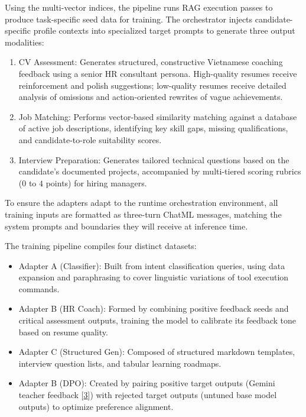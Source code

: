 \documentclass[12pt, a4paper]{report}
\begin{document}
\vspace{0.6cm}
\vspace{0.4cm}

Using the multi-vector indices, the pipeline runs RAG execution passes to produce task-specific seed data for training. The orchestrator injects candidate-specific profile contexts into specialized target prompts to generate three output modalities:
\begin{enumerate}
    \item CV Assessment: Generates structured, constructive Vietnamese coaching feedback using a senior HR consultant persona. High-quality resumes receive reinforcement and polish suggestions; low-quality resumes receive detailed analysis of omissions and action-oriented rewrites of vague achievements.
    \item Job Matching: Performs vector-based similarity matching against a database of active job descriptions, identifying key skill gaps, missing qualifications, and candidate-to-role suitability scores.
    \item Interview Preparation: Generates tailored technical questions based on the candidate's documented projects, accompanied by multi-tiered scoring rubrics ($0$ to $4$ points) for hiring managers.
\end{enumerate}

\vspace{0.6cm}
\vspace{0.4cm}

To ensure the adapters adapt to the runtime orchestration environment, all training inputs are formatted as three-turn ChatML messages, matching the system prompts and boundaries they will receive at inference time.

The training pipeline compiles four distinct datasets:
\begin{itemize}
    \item Adapter A (Classifier): Built from intent classification queries, using data expansion and paraphrasing to cover linguistic variations of tool execution commands.
    \item Adapter B (HR Coach): Formed by combining positive feedback seeds and critical assessment outputs, training the model to calibrate its feedback tone based on resume quality.
    \item Adapter C (Structured Gen): Composed of structured markdown templates, interview question lists, and tabular learning roadmaps.
    \item Adapter B (DPO): Created by pairing positive target outputs (Gemini teacher feedback [\hyperlink{cite3}{3}]) with rejected target outputs (untuned base model outputs) to optimize preference alignment.
\end{itemize}
\end{document}
